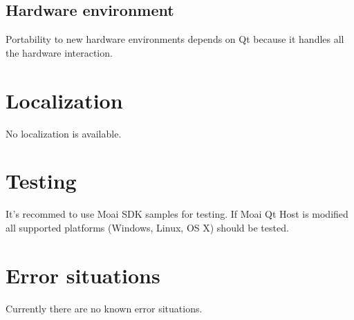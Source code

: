 \subsection{Hardware environment}

Portability to new hardware environments depends on Qt because it handles all the hardware interaction. 

\section{Localization}

No localization is available.

\section{Testing}

It's recommed to use Moai SDK samples for testing. If Moai Qt Host is modified all supported platforms (Windows, Linux, OS X) should be tested.

\section{Error situations}

Currently there are no known error situations.
